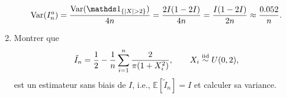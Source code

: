 \documentclass[11pt]{td_um}
\begin{document}
\begin{exo}{}
\begin{enumerate}
{\begin{equation*}
                    \mbox{Var}(I_n^a) =  \frac{\mbox{Var}(\one_{\{|X| >
                    2\}})}{4n} = \frac{2 I (1 - 2 I)}{4 n} = \frac{I (1
                    - 2 I)}{2 n} \approx \frac{0.052}{n}.
                \end{equation*}
            }
        \item Montrer que
            \begin{equation*}
                \tilde{I}_n = \frac{1}{2} - \frac{1}{n} \sum_{i=1}^n
                \frac{2}{\pi (1 + X_i^2)}, \qquad X_i \stackrel{\rm iid}{\sim}
                U(0,2),
            \end{equation*}
            est un estimateur sans biais de $I$, i.e., $\mathbb{E}[\tilde{I}_n] = I$ et calculer sa variance. 
\end{enumerate}
\end{exo}
\end{document}
